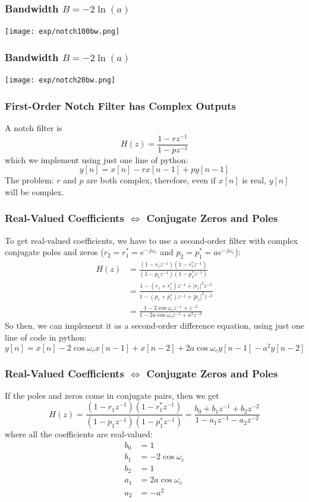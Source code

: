 \documentclass{beamer}
\begin{document}
\begin{frame}
  \frametitle{Bandwidth $B= -2\ln(a)$}

  \centerline{\texttt{[image: exp/notch100bw.png]}}
\end{frame}
\begin{frame}
  \frametitle{Bandwidth $B= -2\ln(a)$}

  \centerline{\texttt{[image: exp/notch20bw.png]}}
\end{frame}

\begin{frame}
  \frametitle{First-Order Notch Filter has Complex Outputs}

  A notch filter is
  \begin{displaymath}
    H(z)=\frac{1-rz^{-1}}{1-pz^{-1}}
  \end{displaymath}
  which we implement using just one line  of python:
  \begin{displaymath}
    y[n] = x[n]-rx[n-1]+py[n-1]
  \end{displaymath}
  The problem: $r$ and $p$ are both complex, therefore, even if $x[n]$ is real,
  $y[n]$ will be complex.
\end{frame}

\begin{frame}
  \frametitle{Real-Valued Coefficients $\Leftrightarrow$ Conjugate Zeros and Poles}

  To get real-valued coefficients, we have to use a second-order
  filter with complex conjugate poles and zeros
  ($r_2=r_1^*=e^{-j\omega_c}$ and $p_2=p_1^*=ae^{-j\omega_c}$):
  \begin{align*}
    H(z)&=\frac{(1-r_1z^{-1})(1-r_1^*z^{-1})}{(1-p_1z^{-1})(1-p_1^*z^{-1})}\\
    &=\frac{1-(r_1+r_1^*)z^{-1}+|r_1|^2z^{-2}}{1-(p_1+p_1^*)z^{-1}+|p_1|^2 z^{-2}}\\
    &=\frac{1-2\cos\omega_c z^{-1}+ z^{-2}}{1-2a\cos\omega_c z^{-1}+a^2 z^{-2}}
  \end{align*}
  So then, we can implement it as a second-order difference equation, using just one line
  of code in python:
  \begin{displaymath}
    y[n]=x[n]-2\cos\omega_cx[n-1]+x[n-2]+2a\cos\omega_cy[n-1]-a^2y[n-2]
  \end{displaymath}
\end{frame}
\begin{frame}
  \frametitle{Real-Valued Coefficients $\Leftrightarrow$ Conjugate Zeros and Poles}
  If the poles and zeros come in conjugate pairs, then we get
  \begin{displaymath}
    H(z)=\frac{(1-r_1z^{-1})(1-r_1^*z^{-1})}{(1-p_1z^{-1})(1-p_1^*z^{-1})}
    =\frac{b_0+b_1z^{-1}+b_2z^{-2}}{1-a_1z^{-1}-a_2z^{-2}}
  \end{displaymath}
  where all the coefficients are real-valued:
  \begin{align*}
    b_0 &= 1\\
    b_1 &= -2\cos\omega_c\\
    b_2 &= 1\\
    a_1 &= 2a\cos\omega_c\\
    a_2 &= -a^2
  \end{align*}
\end{frame}
\end{document}
